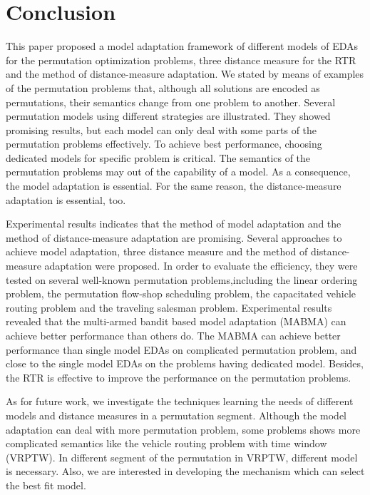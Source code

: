 \section{Conclusion}
\label{ch:conclusion}

This paper proposed a model adaptation framework of different models of EDAs for the permutation optimization problems, three distance measure for the RTR and the method of distance-measure adaptation. We stated by means of examples of the permutation problems that, although all solutions are encoded as permutations, their semantics change from one problem to another. Several permutation models using different strategies are illustrated. They showed promising results, but each model can only deal with some parts of the permutation problems effectively. To achieve best performance, choosing dedicated models for specific problem is critical. The semantics of the permutation problems may out of the capability of a model. As a consequence, the model adaptation is essential. For the same reason, the distance-measure adaptation is essential, too.

Experimental results indicates that the method of model adaptation and the method of distance-measure adaptation are promising. Several approaches to achieve model adaptation, three distance measure and the method of distance-measure adaptation were proposed. In order to evaluate the efficiency, they were tested on several well-known permutation problems,including the linear ordering problem, the permutation flow-shop scheduling problem, the capacitated vehicle routing problem and the traveling salesman problem. Experimental results revealed that the multi-armed bandit based model adaptation (MABMA) can achieve better performance than others do. The MABMA can achieve better performance than single model EDAs on complicated permutation problem, and close to the single model EDAs on the problems having dedicated model. Besides, the RTR is effective to improve the performance on the permutation problems.

As for future work, we investigate the techniques learning the needs of different models and distance measures in a permutation segment. Although the model adaptation can deal with more permutation problem, some problems shows more complicated semantics like the vehicle routing problem with time window (VRPTW). In different segment of the permutation in VRPTW, different model is necessary. Also, we are interested in developing the mechanism which can select the best fit model.